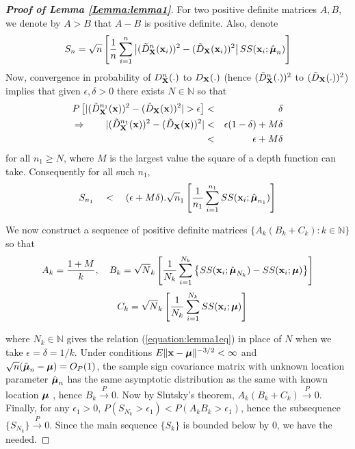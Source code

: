 \documentclass[fleqn,12pt]{article}
\begin{document}
\begin{proof}[\textbf{Proof of Lemma \ref{Lemma:lemma1}}]
For two positive definite matrices $A,B$, we denote by $A>B$ that $A-B$ is positive definite. Also, denote
$$ S_n = \sqrt n \left[ \frac{1}{n} \sum_{i=1}^n \left| (\tilde D^{n} _{\mathbf{X}} ({\bf{x}}_i))^2  - (\tilde D_{\mathbf{X}} ({\bf{x}}_i))^2 \right| SS({\bf{x}}_i; \hat{{\boldsymbol{\mu}}}_n) \right] $$
Now, convergence in probability of $D^n_{\mathbf{X}}(.)$ to $D_{\mathbf{X}}(.)$ (hence $(\tilde D^n_{\mathbf{X}}(.))^2$ to $(\tilde D_{\mathbf{X}}(.))^2$) implies that given $\epsilon, \delta > 0$ there exists $N \in \mathbb{N}$ so that
\begin{eqnarray} \label{equation:lemma1eq}
\notag P \left[ |(\tilde D^{n_1}_{\mathbf{X}}({\bf{x}}))^2 - (\tilde D_{\mathbf{X}}({\bf{x}}))^2| > \epsilon \right] &<& \delta\\
\notag \Rightarrow \qquad |(\tilde D^{n_1}_{\mathbf{X}}({\bf{x}}))^2 - (\tilde D_{\mathbf{X}}({\bf{x}}))^2|
&<& \epsilon(1-\delta) + M\delta \\
&<& \epsilon + M\delta
\end{eqnarray}
for all $n_1 \geq N$, where $M$ is the largest value the square of a depth function can take. Consequently for all such $n_1$,
$$ S_{n_1} \quad < \quad
(\epsilon + M\delta) . \sqrt n_1 \left[ \frac{1}{n_1} \sum_{i=1}^{n_1} SS({\bf{x}}_i; \hat{{\boldsymbol{\mu}}}_{n_1}) \right] $$

We now construct a sequence of positive definite matrices $\{A_k (B_k+C_k) : k \in \mathbb N\} $ so that
$$ A_k = \frac{1+M}{k}, \quad B_k = \sqrt N_k \left[ \frac{1}{N_k} \sum_{i=1}^{N_k} \left\{ SS({\bf{x}}_i; \hat{{\boldsymbol{\mu}}}_{N_k}) - SS({\bf{x}}_i; {\boldsymbol{\mu}}) \right\} \right] $$
$$ \quad C_k = \sqrt N_k \left[ \frac{1}{N_k} \sum_{i=1}^{N_k} SS({\bf{x}}_i; {\boldsymbol{\mu}}) \right] $$

where $N_k \in \mathbb N$ gives the relation (\ref{equation:lemma1eq}) in place of $N$ when we take $\epsilon = \delta  =1/k$. Under conditions $ E\|{\bf{x}} - {\boldsymbol{\mu}}\|^{-3/2} < \infty $ and $\sqrt n (\hat{{\boldsymbol{\mu}}}_n - {\boldsymbol{\mu}}) = O_P(1)$, the sample sign covariance matrix with unknown location parameter $\hat{{\boldsymbol{\mu}}}_n$ has the same asymptotic distribution as the same with known location ${\boldsymbol{\mu}}$ \citep{durre14}, hence $B_k \stackrel{P}{\rightarrow} 0$. Now by Slutsky's theorem, $A_k (B_k+C_k) \stackrel{P}{\rightarrow} 0$. Finally, for any $\epsilon_1 > 0$, $ P(S_{N_k} > \epsilon_1) < P(A_k B_k > \epsilon_1)$, hence the subsequence $\{S_{N_k}\} \stackrel{P}{\rightarrow} 0$. Since the main sequence $\{S_k\}$ is bounded below by 0, we have the needed.
\end{proof}
\end{document}
